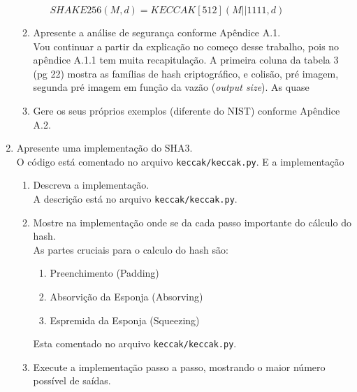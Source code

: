 \documentclass[12pt, a4paper]{article}
\begin{document}
\begin{enumerate}
\begin{enumerate}
\begin{enumerate}
$SHAKE256(M, d) = KECCAK[512] (M || 1111, d)$\\

\end{enumerate}

\item Apresente a análise de segurança conforme Apêndice A.1.\\

Vou continuar a partir da explicação no começo desse trabalho, pois no apêndice
A.1.1 tem muita recapitulação. A primeira coluna da tabela 3 (pg 22) mostra as
famílias de hash criptográfico, e
colisão, pré imagem, segunda pré imagem em função da vazão (\textit{output
size}). As quase


\item Gere os seus próprios exemplos (diferente do NIST) conforme Apêndice
A.2.\\

\end{enumerate}

\item Apresente uma implementação do SHA3.\\

O código está comentado no arquivo \verb|keccak/keccak.py|. E a implementação\\

\begin{enumerate}

\item Descreva a implementação.\\

A descrição está no arquivo \verb|keccak/keccak.py|.\\

\item Mostre na implementação onde se da cada passo importante do cálculo do
hash.\\

As partes cruciais para o calculo do hash são:
  \begin{enumerate}
    \item Preenchimento (Padding)
    \item Absorvição da Esponja (Absorving)
    \item Espremida da Esponja (Squeezing)
  \end{enumerate}

Esta comentado no arquivo \verb|keccak/keccak.py|.\\

\item Execute a implementação passo a passo, mostrando o maior número possível
de saídas.\\




\end{enumerate}
\end{enumerate}
\end{document}
